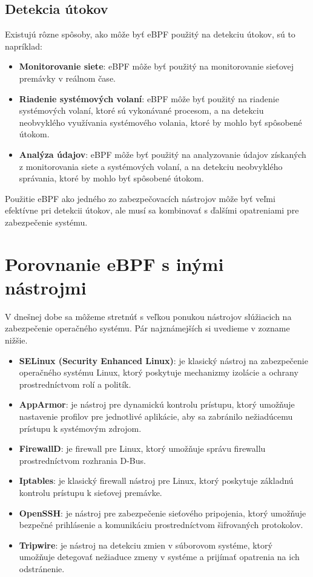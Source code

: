 \subsection{Detekcia útokov}
Existujú rôzne spôsoby, ako môže byť eBPF použitý na detekciu útokov, sú to napríklad:
\begin{itemize}
    \item \textbf{Monitorovanie siete}: eBPF môže byť použitý na monitorovanie sieťovej premávky v reálnom čase.
    \item \textbf{Riadenie systémových volaní}: eBPF môže byť použitý na riadenie systémových volaní, ktoré sú vykonávané procesom, a na detekciu neobvyklého využívania 
    systémového volania, ktoré by mohlo byť spôsobené útokom.
    \item \textbf{Analýza údajov}: eBPF môže byť použitý na analyzovanie údajov získaných z monitorovania siete a systémových volaní, a na detekciu 
    neobvyklého správania, ktoré by mohlo byť spôsobené útokom.    
\end{itemize}
Použitie eBPF ako jedného zo zabezpečovacích nástrojov môže byť veľmi efektívne pri detekcii útokov, ale musí 
sa kombinovať s ďalšími opatreniami pre zabezpečenie systému.

\section{Porovnanie eBPF s inými nástrojmi} 
V dnešnej dobe sa môžeme stretnúť s veľkou ponukou nástrojov slúžiacich na zabezpečenie operačného systému. 
Pár najznámejších si uvedieme v zozname nižšie.  
\begin{itemize}
    \item \textbf{SELinux (Security Enhanced Linux)}: je klasický nástroj na zabezpečenie operačného systému Linux, ktorý poskytuje mechanizmy 
    izolácie a ochrany prostredníctvom rolí a politík.
    \item \textbf{AppArmor}: je nástroj pre dynamickú kontrolu prístupu, ktorý umožňuje nastavenie profilov pre jednotlivé aplikácie, 
    aby sa zabránilo nežiadúcemu prístupu k systémovým zdrojom.
    \item \textbf{FirewallD}: je firewall pre Linux, ktorý umožňuje správu firewallu prostredníctvom rozhrania D-Bus.
    \item \textbf{Iptables}: je klasický firewall nástroj pre Linux, ktorý poskytuje základnú kontrolu prístupu k sieťovej premávke.
    \item \textbf{OpenSSH}: je nástroj pre zabezpečenie sieťového pripojenia, ktorý umožňuje bezpečné prihlásenie a komunikáciu 
    prostredníctvom šifrovaných protokolov.
    \item \textbf{Tripwire}: je nástroj na detekciu zmien v súborovom systéme, ktorý umožňuje detegovať nežiaduce zmeny v 
    systéme a prijímať opatrenia na ich odstránenie.
\end{itemize}

